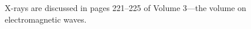 \documentclass{article}
\begin{document}
X-rays are discussed in pages 221--225 of Volume 3---the volume on electromagnetic waves.
\end{document}
